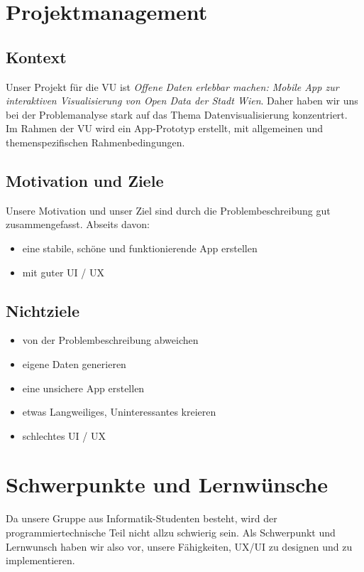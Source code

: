 \section{Projektmanagement}
%
\subsection{Kontext}
Unser Projekt für die VU ist \emph{Offene Daten erlebbar machen: Mobile App zur interaktiven Visualisierung von Open Data der Stadt Wien}. Daher haben wir uns bei der Problemanalyse stark auf das Thema Datenvisualisierung konzentriert.\\
\noindent
Im Rahmen der VU wird ein App-Prototyp erstellt, mit allgemeinen und themenspezifischen Rahmenbedingungen.
%
\subsection{Motivation und Ziele}
Unsere Motivation und unser Ziel sind durch die Problembeschreibung gut zusammengefasst.
Abseits davon:
%
\begin{itemize}
    \item eine stabile, schöne und funktionierende App erstellen
    \item mit guter UI / UX
\end{itemize}
%
\subsection{Nichtziele}
%
\begin{itemize}
    \item von der Problembeschreibung abweichen
    \item eigene Daten generieren
    \item eine unsichere App erstellen
    \item etwas Langweiliges, Uninteressantes kreieren
    \item schlechtes UI / UX
\end{itemize}
%
\section{Schwerpunkte und Lernwünsche}
Da unsere Gruppe aus Informatik-Studenten besteht, wird der programmiertechnische Teil nicht allzu schwierig sein. Als Schwerpunkt und Lernwunsch haben wir also vor, unsere Fähigkeiten, UX/UI zu designen und zu implementieren.